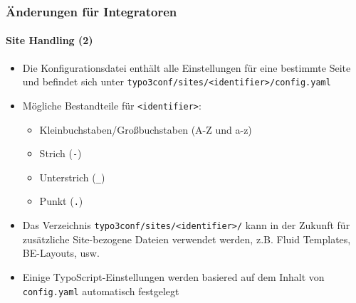 
\begin{frame}[fragile]
	\frametitle{Änderungen für Integratoren}
	\framesubtitle{Site Handling (2)}

	\begin{itemize}
		\item Die Konfigurationsdatei  enthält alle Einstellungen für eine bestimmte Seite und
			befindet sich unter \texttt{typo3conf/sites/<identifier>/config.yaml}
		\item Mögliche Bestandteile für \texttt{<identifier>}:
			\begin{itemize}
				\item \small Kleinbuchstaben/Großbuchstaben (A-Z und a-z)\normalsize
				\item \small Strich (\texttt{-})\normalsize
				\item \small Unterstrich (\texttt{\_})\normalsize
				\item \small Punkt (\texttt{.})\normalsize
			\end{itemize}
		\item Das Verzeichnis \texttt{typo3conf/sites/<identifier>/} kann in der Zukunft für zusätzliche 
			Site-bezogene Dateien verwendet werden, z.B. Fluid Templates, BE-Layouts, usw.
		\item Einige  TypoScript-Einstellungen werden basiered auf dem Inhalt von \texttt{config.yaml}
			automatisch festgelegt
	\end{itemize}

\end{frame}


